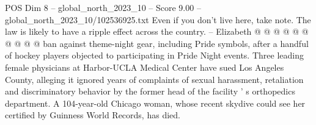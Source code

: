 \begin{textsample}{POS Dim 8 – global\_north\_2023\_10 – Score 9.00 – global\_north\_2023\_10/102536925.txt}
Even if you don't live here, take note.
The law is likely to have a ripple effect across the country. -- Elizabeth @ @ @ @ @ @ @ @ @ @ ban against theme-night gear, including Pride symbols, after a handful of hockey players objected to participating in Pride Night events.
Three leading female physicians at Harbor-UCLA Medical Center have sued Los Angeles County, alleging it ignored years of complaints of sexual harassment, retaliation and discriminatory behavior by the former head of the facility ' s orthopedics department.
A 104-year-old Chicago woman, whose recent skydive could see her certified by Guinness World Records, has died.

\end{textsample}
